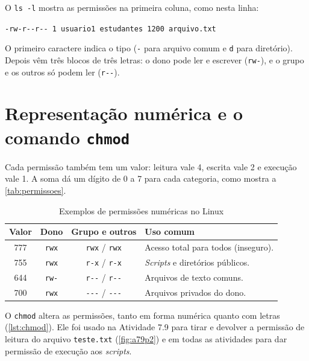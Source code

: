 O \texttt{ls -l} mostra as permissões na primeira coluna, como nesta linha:

\begin{center}
    \texttt{-rw-r-{}-r-{}- 1 usuario1 estudantes 1200 arquivo.txt}
\end{center}

\noindent O primeiro caractere indica o
tipo (\texttt{-} para arquivo comum e \texttt{d} para diretório). Depois vêm três blocos de três
letras: o dono pode ler e escrever (\texttt{rw-}), e o grupo e os outros só podem ler
(\texttt{r-{}-}).

\section{Representação numérica e o comando \texttt{chmod}}\label{sec:chmod}

Cada permissão também tem um valor: leitura vale 4, escrita vale 2 e execução vale 1. A soma dá
um dígito de 0 a 7 para cada categoria, como mostra a \autoref{tab:permissoes}.

\begin{table}[H]
    \centering
    \caption{Exemplos de permissões numéricas no Linux}
    \label{tab:permissoes}
    \begin{tabularx}{\linewidth}{cccX}
        \toprule
        \textbf{Valor} & \textbf{Dono} & \textbf{Grupo e outros} & \textbf{Uso comum} \\
        \midrule
        777 & \texttt{rwx} & \texttt{rwx} / \texttt{rwx} & Acesso total para todos (inseguro). \\
        755 & \texttt{rwx} & \texttt{r-x} / \texttt{r-x} & \textit{Scripts} e diretórios públicos. \\
        644 & \texttt{rw-} & \texttt{r-{}-} / \texttt{r-{}-} & Arquivos de texto comuns. \\
        700 & \texttt{rwx} & \texttt{-{}-{}-} / \texttt{-{}-{}-} & Arquivos privados do dono. \\
        \bottomrule
    \end{tabularx}
\end{table}

O \texttt{chmod} altera as permissões, tanto em forma numérica quanto com letras
(\autoref{lst:chmod}). Ele foi usado na Atividade 7.9 para tirar e devolver a permissão de
leitura do arquivo \texttt{teste.txt} (\autoref{fig:a79p2}) e em todas as atividades para dar
permissão de execução aos \textit{scripts}.

